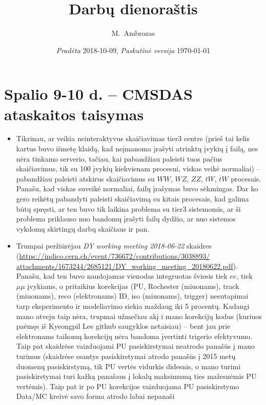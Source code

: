 \documentclass[a4paper, 12pt]{article}
\begin{document}

\title{Darbų dienoraštis}
\author{M.\ Ambrozas}
\date{\textit{Pradėta} 2018-10-09, \textit{Paskutinė versija} \today}
\maketitle
\pagebreak

\section{Spalio 9-10 d. -- CMSDAS ataskaitos taisymas}
\begin{itemize}
	\item Tikrinau, ar veikia neinteraktyvus skaičiavimas tier3 centre
	(prieš tai kelis kartus buvo išmetę klaidą, kad neįmanoma įrašyti atrinktų
	įvykių į failą, nes nėra tinkamo serverio, tačiau, kai pabandžiau paleisti
	tuos pačius skaičiavimus, tik su 100 įvykių kiekvienam procesui, viskas veikė
	normaliai) -- pabandžiau paleisti atskirus skaičiavimus su $WW$, $WZ$, $ZZ$,
	$tW$, $\overline{t}W$ procesais. Panašu, kad viskas suveikė normaliai, failų
	įrašymas buvo sėkmingas. Dar ko gero reikėtų pabandyti paleisti skaičiavimą
	su kitais procesais, kad galima būtų spręsti, ar ten buvo tik laikina problema
	su tier3 sistemomis, ar ši problema priklauso nuo bandomų įrašyti failų dydžio,
	ar nuo sistemos vykdomų skirtingų darbų skaičiaus ir pan.
	\item Trumpai peržiūrėjau \textit{DY working meeting 2018-06-22} skaidres
	(\url{https://indico.cern.ch/event/736672/contributions/3038893/
	attachments/1673244/2685121/DY_working_meeting_20180622.pdf}).
	Panašu, kad ten buvo naudojamas vienodas integruotas šviesis tiek $ee$, tiek
	$\mu\mu$ įvykiams, o pritaikius korekcijas (PU, Rochester (miuonams),
	track (miuonams), reco (elektronams) ID, iso (miuonams), trigger) nesutapimai
	tarp eksperimento ir modeliavimo siekia maždaug iki 5 procentų. Kadangi mano
	atveju taip nėra, trupmai užmečiau akį i mano korekcijų kodus (kuriuos paėmęs
	iš Kyeongpil Lee github saugyklos netaisiau) -- bent jau prie elektronams
	taikomų korekcijų nėra bandoma įvertinti trigerio efektyvumo. Taip pat skaidrėse
	vaizduojami PU pasiskirstymai neatrodo panašūs į mano turimus (skaidrėse
	esantys pasiskirstymai atrodo panašūs į 2015 metų duomenų pasiskirstymą, tik
	PU vertės vidurkis didesnis, o mano turimi pasiskirstymai turi kažką panašaus
	į lokalų maksimumą ties mažesnėmis PU vertėmis). Taip pat ir po PU korekcijos
	vaizduojama PU pasiskirstymo Data/MC kreivė savo forma atrodo labai nepanaši

\end{itemize}
\end{document}
